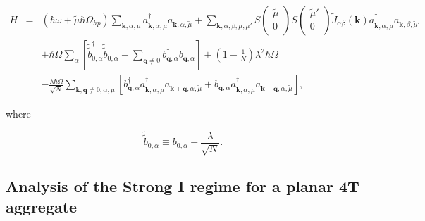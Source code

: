\documentclass[pt12]{article}
\newcommand{\bfk}{\mathbf{k}}
\newcommand{\bfq}{\mathbf{q}}
\newcommand{\tmu}{\tilde{\mu}}
\begin{document}
\begin{eqnarray}\label{H_FT_q0}
H&=&\left(\hbar\omega+\tmu\hbar\Omega_{hp}\right)\sum_{\bfk,\alpha,\tmu}
a^\dagger_{\bfk,\alpha,\tmu}a_{\bfk,\alpha,\tmu}
+\sum_{\bfk,\alpha,\beta,\tmu,\tmu'} S\left(
                                \begin{array}{c}
                                    \tmu \\
                                    0 \\
                                  \end{array}
                                \right)
S\left(
                                \begin{array}{c}
                                    \tmu' \\
                                    0 \\
                                  \end{array}
                                \right)
\tilde{J}_{\alpha\beta}(\bfk)
a^\dagger_{\bfk,\alpha,\tmu}a_{\bfk,\beta,\tmu'}\\
\nonumber &&+\hbar\Omega\sum_{\alpha}\left[
\tilde{\tilde{b}}^\dagger_{0,\alpha}\tilde{\tilde{b}}_{0,\alpha}+\sum_{\bfq\neq
0}
b^\dagger_{\bfq,\alpha}b_{\bfq,\alpha}\right]+\left(1-\frac{1}{N}\right)\lambda^2\hbar\Omega
\\
\nonumber && -\frac{\lambda\hbar\Omega}{\sqrt{N}}\sum_{\bfk,\bfq\neq
0,\alpha,\tmu} \left[
b^\dagger_{\bfq,\alpha}a^\dagger_{\bfk,\alpha,\tmu}a_{\bfk+\bfq,\alpha,\tmu}
+
b_{\bfq,\alpha}a^\dagger_{\bfk,\alpha,\tmu}a_{\bfk-\bfq,\alpha,\tmu}
\right],
\end{eqnarray}

where

\begin{equation}\label{b0}
\tilde{\tilde{b}}_{0,\alpha} \equiv b_{0,\alpha}-
\frac{\lambda}{\sqrt{N}}.
\end{equation}


\subsection{Analysis of the Strong I regime for a planar 4T aggregate}
\end{document}
